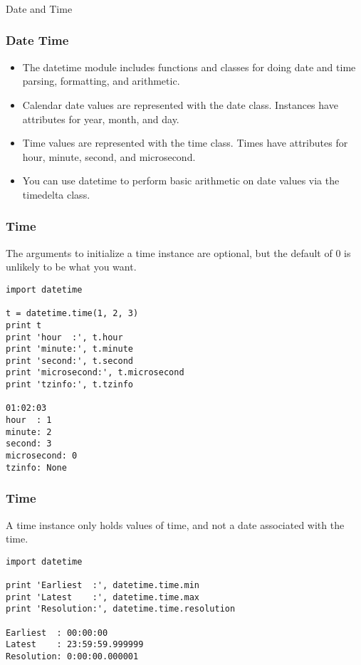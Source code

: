 \begin{frame}[fragile]\frametitle{}
\begin{center}
{\Large Date and Time}
\end{center}
\end{frame}


\begin{frame}[fragile]\frametitle{Date Time}

    \begin{itemize}
    \item  The datetime module includes functions and classes for doing date and time parsing, formatting, and arithmetic.
    \item Calendar date values are represented with the date class. Instances have attributes for year, month, and day. 
    \item Time values are represented with the time class. Times have attributes for hour, minute, second, and microsecond. 
    \item  You can use datetime to perform basic arithmetic on date values via the timedelta class. 
    \end{itemize}
\end{frame}

\begin{frame}[fragile]\frametitle{Time}
The arguments to initialize a time instance are optional, but the default of 0 is unlikely to be what you want.
\begin{lstlisting}
import datetime

t = datetime.time(1, 2, 3)
print t
print 'hour  :', t.hour
print 'minute:', t.minute
print 'second:', t.second
print 'microsecond:', t.microsecond
print 'tzinfo:', t.tzinfo

01:02:03
hour  : 1
minute: 2
second: 3
microsecond: 0
tzinfo: None
\end{lstlisting}

\end{frame}

\begin{frame}[fragile]\frametitle{ Time}
A time instance only holds values of time, and not a date associated with the time.
\begin{lstlisting}
import datetime

print 'Earliest  :', datetime.time.min
print 'Latest    :', datetime.time.max
print 'Resolution:', datetime.time.resolution

Earliest  : 00:00:00
Latest    : 23:59:59.999999
Resolution: 0:00:00.000001
\end{lstlisting}

\end{frame}

